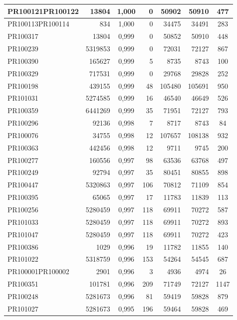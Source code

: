 \begin{center}
\begin{longtable}{lr|c|rrr|c}
	PR100121PR100122 & 13804 & 1,000 & 0 & 50902 & 50910 & 477 \\ \hline
	PR100113PR100114 & 834 & 1,000 & 0 & 34475 & 34491 & 283 \\ \hline
	PR100317 & 13804 & 0,999 & 0 & 50852 & 50910 & 448 \\ \hline
	PR100239 & 5319853 & 0,999 & 0 & 72031 & 72127 & 867 \\ \hline
	PR100390 & 165627 & 0,999 & 5 & 8735 & 8743 & 100 \\ \hline
	PR100329 & 717531 & 0,999 & 0 & 29768 & 29828 & 252 \\ \hline
	PR100198 & 439155 & 0,999 & 48 & 105480 & 105691 & 950 \\ \hline
	PR101031 & 5274585 & 0,999 & 16 & 46540 & 46649 & 526 \\ \hline
	PR100359 & 6441269 & 0,999 & 35 & 71951 & 72127 & 793 \\ \hline
	PR100296 & 92136 & 0,998 & 7 & 8717 & 8743 & 84 \\ \hline
	PR100076 & 34755 & 0,998 & 12 & 107657 & 108138 & 932 \\ \hline
	PR100363 & 442456 & 0,998 & 12 & 9711 & 9745 & 200 \\ \hline
	PR100277 & 160556 & 0,997 & 98 & 63536 & 63768 & 497 \\ \hline
	PR100249 & 92794 & 0,997 & 35 & 80451 & 80855 & 898 \\ \hline
	PR100447 & 5320863 & 0,997 & 106 & 70812 & 71109 & 854 \\ \hline
	PR100395 & 65065 & 0,997 & 17 & 11783 & 11839 & 113 \\ \hline
	PR100256 & 5280459 & 0,997 & 118 & 69911 & 70272 & 587 \\ \hline
	PR101033 & 5280459 & 0,997 & 118 & 69911 & 70272 & 893 \\ \hline
	PR101047 & 5280459 & 0,997 & 118 & 69911 & 70272 & 423 \\ \hline
	PR100386 & 1029 & 0,996 & 19 & 11782 & 11855 & 140 \\ \hline
	PR101022 & 5318759 & 0,996 & 153 & 54264 & 54545 & 687 \\ \hline
	PR100001PR100002 & 2901 & 0,996 & 3 & 4936 & 4974 & 26 \\ \hline
	PR100351 & 101781 & 0,996 & 209 & 71749 & 72127 & 1147 \\ \hline
	PR100248 & 5281673 & 0,996 & 81 & 59419 & 59828 & 879 \\ \hline
	PR101027 & 5281673 & 0,995 & 196 & 59464 & 59828 & 469 \\ \hline

\end{longtable}
\end{center}
